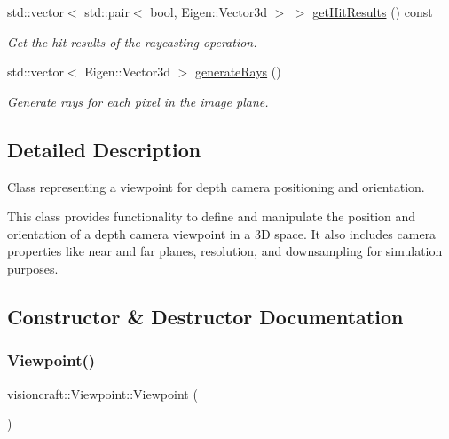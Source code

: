 \begin{DoxyCompactItemize}
std\+::vector$<$ std\+::pair$<$ bool, Eigen\+::\+Vector3d $>$ $>$ \hyperlink{classvisioncraft_1_1Viewpoint_a06ee41338f5dbe482fd4ad7dab244b85}{get\+Hit\+Results} () const
\begin{DoxyCompactList}\small\item\em Get the hit results of the raycasting operation. \end{DoxyCompactList}\item 
std\+::vector$<$ Eigen\+::\+Vector3d $>$ \hyperlink{classvisioncraft_1_1Viewpoint_adeee2e5fa09522d886656848af37ff11}{generate\+Rays} ()
\begin{DoxyCompactList}\small\item\em Generate rays for each pixel in the image plane. \end{DoxyCompactList}\end{DoxyCompactItemize}


\subsection{Detailed Description}
Class representing a viewpoint for depth camera positioning and orientation. 

This class provides functionality to define and manipulate the position and orientation of a depth camera viewpoint in a 3D space. It also includes camera properties like near and far planes, resolution, and downsampling for simulation purposes. 

\subsection{Constructor \& Destructor Documentation}
\mbox{\label{classvisioncraft_1_1Viewpoint_a87bab63b8b2bd6123742307bb47d3392}} 
\subsubsection{\texorpdfstring{Viewpoint()}{Viewpoint()}\hspace{0.1cm}{\footnotesize\ttfamily [1/4]}}
{\footnotesize\ttfamily visioncraft\+::\+Viewpoint\+::\+Viewpoint (\begin{DoxyParamCaption}{ }\end{DoxyParamCaption})}



